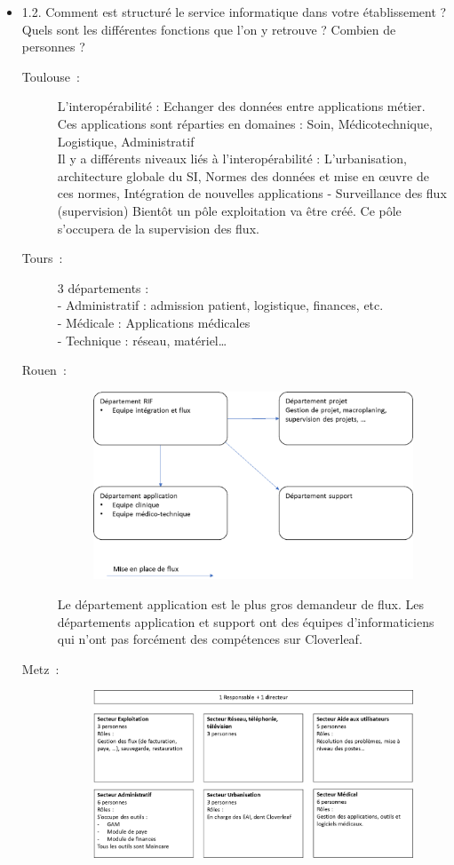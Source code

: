 \begin{itemize}
	  \item 1.2. Comment est structuré le service informatique dans votre
	  établissement ? Quels sont les différentes fonctions que l’on y retrouve ? Combien de personnes ?
	  \begin{description}
	  	\item[Toulouse~:] L’interopérabilité : Echanger des données entre
	  	applications métier. Ces applications sont réparties en domaines : Soin,
	  	Médicotechnique, Logistique, Administratif\\
		Il y a différents niveaux liés à l’interopérabilité : L’urbanisation,
		architecture globale du SI, Normes des données et mise en œuvre de ces normes,
		Intégration de nouvelles applications -	Surveillance des flux (supervision)
		Bientôt un pôle exploitation va être créé. Ce pôle s’occupera de la
		supervision des flux.
	  	\item[Tours~:] 3 départements : \\
		-	Administratif : admission patient, logistique, finances, etc.\\
		-	Médicale : Applications médicales\\
		-	Technique : réseau, matériel…
	  	\item[Rouen~:]
	  	\begin{figure}[H]
			\centering
			\includegraphics[width=15cm]{../img/annexes/orga_rouen.png}
		\end{figure}
		Le département application est le plus gros demandeur de flux. Les
		départements application et support ont des équipes d’informaticiens qui
		n’ont pas forcément des compétences sur Cloverleaf.
	  	\item[Metz~:]
	  	\begin{figure}[H]
			\centering
			\includegraphics[width=15cm]{../img/annexes/orga_metz.png}

\end{figure}
\end{description}
\end{itemize}

